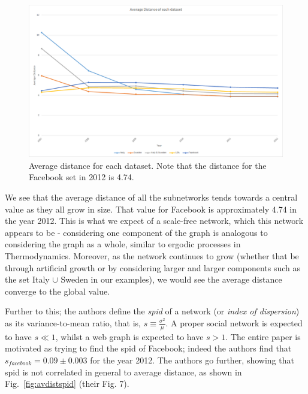     \begin{figure}[H]
        \centering
        \includegraphics[width=\textwidth]{journals/SR-AverageDistance.png}
        \caption{Average distance for each dataset. Note that the distance for the Facebook set in 2012 is 4.74.}
        \label{fig:avdist}
    \end{figure}
    
    We see that the average distance of all the subnetworks tends towards a central value as they all grow in size. That value for Facebook is approximately 4.74 in the year 2012. This is what we expect of a scale-free network, which this network appears to be - considering one component of the graph is analogous to considering the graph as a whole, similar to ergodic processes in Thermodynamics. Moreover, as the network continues to grow (whether that be through artificial growth or by considering larger and larger components such as the set Italy $\cup$ Sweden in our examples), we would see the average distance converge to the global value.
    
    Further to this; the authors define the \textit{spid} of a network (or \textit{index of dispersion}) as its variance-to-mean ratio, that is, $s\equiv\frac{\sigma^2}{\mu}$. A proper social network is expected to have $s\ll 1$, whilst a web graph is expected to have $s>1$. The entire paper is motivated as trying to find the spid of Facebook; indeed the authors find that $s_{facebook}=0.09\pm0.003$ for the year 2012. The authors go further, showing that spid is not correlated in general to average distance, as shown in Fig.~\ref{fig:avdistspid} (their Fig. 7).
    
